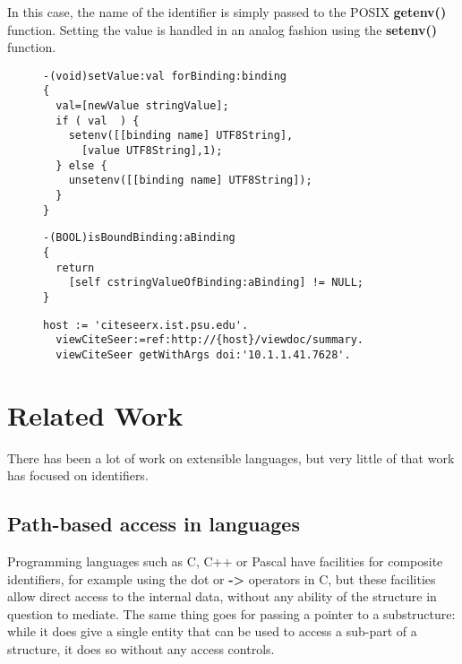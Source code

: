 \documentclass[preprint,authoryear]{acm_proc_article-sp}
\begin{document}
In this case, the name of the identifier is simply passed to the POSIX {\bf getenv()} function.
Setting the value is handled in an analog fashion using the {\bf setenv()} function.


\begin{figure}[htbp]
\begin{lstlisting}[style=L,label=setvalue-env,caption=Set value in env: scheme.]
-(void)setValue:val forBinding:binding
{
  val=[newValue stringValue];
  if ( val  ) {
    setenv([[binding name] UTF8String],
      [value UTF8String],1);
  } else {
    unsetenv([[binding name] UTF8String]);
  }
}
\end{lstlisting}
\end{figure}


\begin{figure}[htbp]
\begin{lstlisting}[style=L,label=hasValue-env,caption=Checking for presence of value in env: scheme.]
-(BOOL)isBoundBinding:aBinding
{
  return 
    [self cstringValueOfBinding:aBinding] != NULL;
}
\end{lstlisting}
\end{figure}


\begin{figure}[htbp]
\begin{lstlisting}[style=L,label=url-args,caption=URL arguments via reference and higher order message.]
  host := 'citeseerx.ist.psu.edu'.
  viewCiteSeer:=ref:http://{host}/viewdoc/summary.
  viewCiteSeer getWithArgs doi:'10.1.1.41.7628'.
\end{lstlisting}
\end{figure}


\section{Related Work}
\label{related-work}

There has been a lot of work on extensible languages, but very little of that work 
has focused on identifiers.  

\subsection{Path-based access in languages}

Programming languages such as C, C++ or Pascal have facilities for composite
identifiers, for example using the dot or {\bf -> } operators in C, but these facilities allow
direct access to the internal data, without any ability of the structure in question to 
mediate.  The same thing goes for passing a pointer to a substructure:  while it
does give a single entity that can be used to access a sub-part of a structure, it
does so without any access controls.
\end{document}
